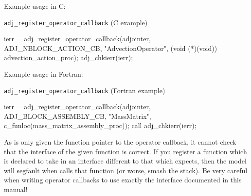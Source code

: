 Example usage in C:

\begin{boxwithtitle}{\texttt{adj_register_operator_callback} (C example)}
\begin{minipage}{\columnwidth}
\begin{ccode}
  ierr = adj_register_operator_callback(adjointer, ADJ_NBLOCK_ACTION_CB, 
                                   "AdvectionOperator",
                                   (void (*)(void)) advection_action_proc);
  adj_chkierr(ierr);
\end{ccode}
\end{minipage}
\end{boxwithtitle}

Example usage in Fortran:

\begin{boxwithtitle}{\texttt{adj_register_operator_callback} (Fortran example)}
\begin{minipage}{\columnwidth}
\begin{fortrancode}
  ierr = adj_register_operator_callback(adjointer, ADJ_BLOCK_ASSEMBLY_CB, 
                                    "MassMatrix",
                                    c_funloc(mass_matrix_assembly_proc));
  call adj_chkierr(ierr);
\end{fortrancode}
\end{minipage}
\end{boxwithtitle}

As \libadjoint is only given the function pointer to the operator callback, it cannot check that the
interface of the given function is correct. If you register a function which is declared to take 
in an interface different to that which \libadjoint expects, then the model will segfault when
\libadjoint calls that function (or worse, smash the stack). Be very careful when writing operator callbacks to use exactly
the interface documented in this manual!
